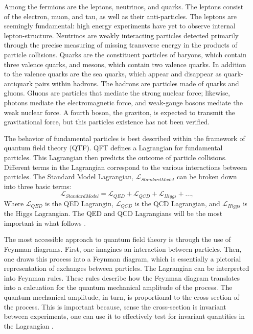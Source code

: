 Among the fermions are the leptons, neutrinos, and quarks. The leptons consist of the electron, muon, and tau, as well as their anti-particles. The leptons are seemingly fundamental: high energy experiments have yet to observe internal lepton-structure. Neutrinos are weakly interacting particles detected primarily through the precise measuring of missing transverse energy in the products of particle collisions. Quarks are the constituent particles of baryons, which contain three valence quarks, and mesons, which contain two valence quarks. In addition to the valence quarks are the sea quarks, which appear and disappear as quark-antiquark pairs within hadrons. The hadrons are particles made of quarks and gluons. Gluons are particles that mediate the strong nuclear force; likewise, photons mediate the electromagnetic force, and weak-gauge bosons mediate the weak nuclear force. A fourth boson, the graviton, is expected to transmit the gravitational force, but this particles existence has not been verified. 

The behavior of fundamental particles is best described within the framework of quantum field theory (QTF). QFT defines a Lagrangian for fundamental particles. This Lagrangian then predicts the outcome of particle collisions. Different terms in the Lagrangian correspond to the various interactions between particles. The Standard Model Lagrangian, $\mathcal{L}_{Standard Model}$ can be broken down into three basic terms:	
\begin{equation}
\mathcal{L}_{Standard Model} = \mathcal{L}_{QED} + \mathcal{L}_{QCD} + \mathcal{L}_{Higgs} + ... ,  
\end{equation} 
Where $\mathcal{L}_{QED}$ is the QED Lagrangin, $\mathcal{L}_{QCD}$ is the QCD Lagrangian, and $\mathcal{L}_{Higgs}$ is the Higgs Lagrangian. The QED and QCD Lagrangians will be the most important in what follows \cite{Halzen:1984mc}. 

The most accessible approach to quantum field theory is through the use of Feynman diagrams. First, one imagines an interaction between particles. Then, one draws this process into a Feynman diagram, which is essentially a pictorial representation of exchanges between particles. The Lagrangian can be interpreted into Feynman rules. These rules describe how the Feynman diagram translates into a calcuation for the quantum mechanical amplitude of the process. The quantum mechanical amplitude, in turn, is proportional to the cross-section of the process. This is important because, sense the cross-section is invariant between experiments, one can use it to effectively test for invariant quantities in the Lagrangian \cite{Peskin:1995ev}.

